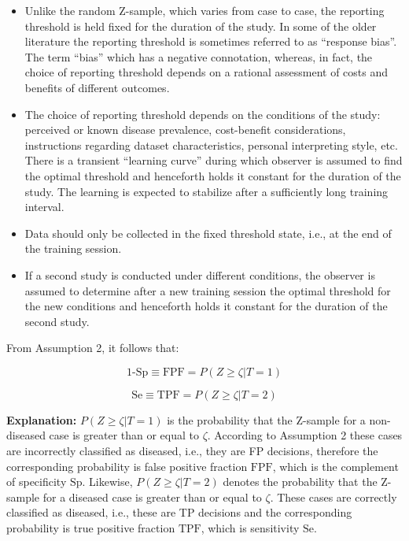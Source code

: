 \documentclass[
]{book}
\begin{document}
\begin{itemize}
\item
  Unlike the random Z-sample, which varies from case to case, the reporting threshold is held fixed for the duration of the study. In some of the older literature the reporting threshold is sometimes referred to as ``response bias''. The term ``bias'' which has a negative connotation, whereas, in fact, the choice of reporting threshold depends on a rational assessment of costs and benefits of different outcomes.
\item
  The choice of reporting threshold depends on the conditions of the study: perceived or known disease prevalence, cost-benefit considerations, instructions regarding dataset characteristics, personal interpreting style, etc. There is a transient ``learning curve'' during which observer is assumed to find the optimal threshold and henceforth holds it constant for the duration of the study. The learning is expected to stabilize after a sufficiently long training interval.
\item
  Data should only be collected in the fixed threshold state, i.e., at the end of the training session.
\item
  If a second study is conducted under different conditions, the observer is assumed to determine after a new training session the optimal threshold for the new conditions and henceforth holds it constant for the duration of the second study.
\end{itemize}

From Assumption 2, it follows that:

\begin{equation} 
\text{1-Sp} \equiv \text{FPF}=P(Z\ge \zeta|T=1)
\label{eq:binary-task-model-fpf}
\end{equation}

\begin{equation} 
\text{Se} \equiv \text{TPF}=P(Z\ge \zeta|T=2)
\label{eq:binary-task-model-tpf}
\end{equation}

\textbf{Explanation:} \(P(Z\ge \zeta|T=1)\) is the probability that the Z-sample for a non-diseased case is greater than or equal to \(\zeta\). According to Assumption 2 these cases are incorrectly classified as diseased, i.e., they are FP decisions, therefore the corresponding probability is false positive fraction \(\text{FPF}\), which is the complement of specificity \(\text{Sp}\). Likewise, \(P(Z\ge \zeta|T=2)\) denotes the probability that the Z-sample for a diseased case is greater than or equal to \(\zeta\). These cases are correctly classified as diseased, i.e., these are TP decisions and the corresponding probability is true positive fraction \(\text{TPF}\), which is sensitivity \(\text{Se}\).
\end{document}
